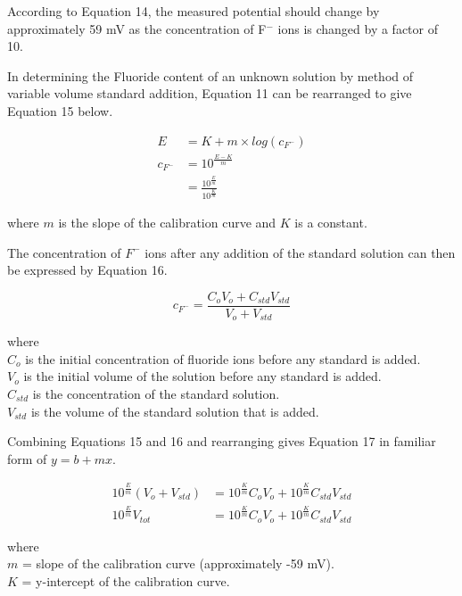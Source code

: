 \documentclass{article}
\begin{document}
According to Equation 14, the measured potential should change by approximately
59 mV as the concentration of F$^-$ ions is changed by a factor of 10.

In determining the Fluoride content of an unknown solution by method of variable
volume standard addition, Equation 11 can be rearranged to give Equation 15
below.
\begin{center}
    \begin{equation}
    \begin{aligned}
        E &= K + m\times log(c_{F^-}) \\
        c_{F^-} &= 10^{\frac{E-K}{m}}  \\
        &= \frac{10^{\frac{E}{m}}}{10^{\frac{K}{m}}}
    \end{aligned}
    \end{equation}
\end{center}
where $m$ is the slope of the calibration curve and $K$ is a constant.

The concentration of $F^-$ ions after any addition of the standard solution can
then be expressed by Equation 16.
\begin{center}
    \begin{equation}
        c_{F^-} = \frac{C_oV_o + C_{std}V_{std}}{V_o + V_{std}}
    \end{equation}
\end{center}
where \\
$C_o$ is the initial concentration of fluoride ions before any standard is
added. \\
$V_o$ is the initial volume of the solution before any standard is added. \\
$C_{std}$ is the concentration of the standard solution. \\
$V_{std}$ is the volume of the standard solution that is added. 

Combining Equations 15 and 16 and rearranging gives Equation 17 in familiar
form of $y=b+mx$.
\begin{center}
    \begin{equation}
    \begin{aligned}
        10^{\frac{E}{m}} (V_o + V_{std}) &= 10^{\frac{K}{m}}C_oV_o +
        10^{\frac{K}{m}}C_{std}V_{std} \\
        10^{\frac{E}{m}} V_{tot} &= 10^{\frac{K}{m}} C_oV_o +
        10^{\frac{K}{m}}C_{std}{V_{std}}
    \end{aligned}
    \end{equation}
\end{center}
where \\
$m$ = slope of the calibration curve (approximately -59 mV).  \\
$K$ = y-intercept of the calibration curve.
\end{document}
